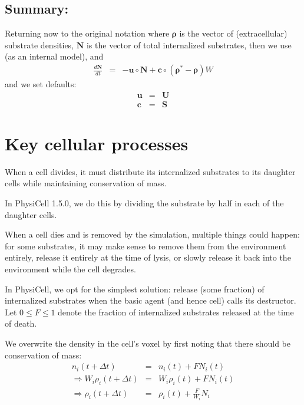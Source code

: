 \documentclass[11point]{article}
\newcommand{\beq}{\begin{eqnarray}}
\newcommand{\eeq}{\end{eqnarray}}
\renewcommand{\vec}[1]{\bm{#1}}
\begin{document}
\subsection{Summary:}
Returning now to the original notation where $\vec{\rho}$ is the vector of (extracellular) substrate densities, $\vec{N}$ is the vector of total internalized 
substrates, then we use (as an internal model), and 
\beq
\frac{d\vec{N}}{dt} & = & 
- \vec{u}\circ \vec{N} + \vec{c} \circ \left( \vec{\rho}^* - \vec{\rho}  \right)W
\eeq
and we set defaults: 
\beq
\vec{u} & = & \vec{U} \\
\vec{c} & = & \vec{S} 
\eeq

\section{Key cellular processes}
When a cell divides, it must distribute its internalized substrates to its daughter cells while maintaining conservation of mass. 

In PhysiCell 1.5.0, we do this by dividing the substrate by half in each of the daughter cells. 

When a cell dies and is removed by the simulation, multiple things could happen: for some substrates, it may make sense to 
remove them from the environment entirely, release it entirely at the time of lysis, or slowly release it back into the environment 
while the cell degrades. 

In PhysiCell, we opt for the simplest solution: release (some fraction) of internalized substrates when the basic agent (and hence cell) calls 
its destructor. Let $0 \le F \le 1$ denote the fraction of internalized 
substrates released at the time of death. 

We overwrite the density in the cell's voxel by first noting that there should be conservation of mass: 
\beq
n_i( t + \Delta t ) & = & 
n_i( t ) + F N_i (t)  \\ 
\Longrightarrow 
W_i \rho_i(t + \Delta t) & = &
W_i \rho_i(t) + F N_i(t) \\ 
\Longrightarrow 
\rho_i( t + \Delta t ) & = & 
\rho_i(t) + \frac{F}{W_i} N_i 
\eeq
\end{document}
